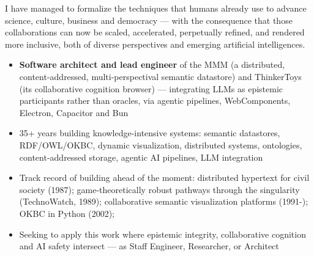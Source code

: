 \begin{par}
  I have managed to formalize the techniques that humans already use to advance
  science, culture, business and democracy --- with the consequence that those
  collaborations can now be scaled, accelerated, perpetually refined, and rendered
  more inclusive, both of diverse perspectives and emerging artificial intelligences.
  \begin{itemize} \small
    \setlength\itemsep{.05em}
  \item \textbf{Software architect and lead engineer} of the MMM (a distributed,
    content-addressed, multi-perspectival semantic datastore) and ThinkerToys
    (its collaborative cognition browser) --- integrating LLMs as epistemic
    participants rather than oracles, via agentic pipelines, WebComponents,
    Electron, Capacitor and Bun
  \item 35+ years building knowledge-intensive systems: semantic datastores,
    RDF/OWL/OKBC, dynamic visualization, distributed systems, ontologies,
    content-addressed storage, agentic AI pipelines, LLM integration
  \item Track record of building ahead of the moment:
    distributed hypertext for civil society (1987);
    game-theoretically robust pathways through the singularity (TechnoWatch, 1989);
    collaborative semantic visualization platforms (1991-); %
    OKBC in Python (2002);
  \item Seeking to apply this work where epistemic integrity, collaborative cognition
    and AI safety intersect --- as Staff Engineer, Researcher, or Architect
  \end{itemize}

\end{par}
